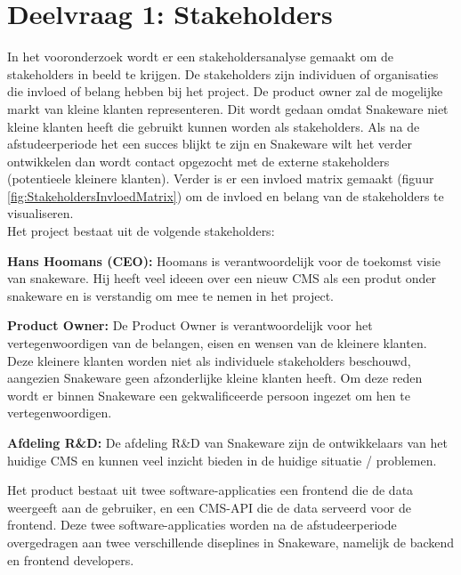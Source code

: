\section{Deelvraag 1: Stakeholders}
In het vooronderzoek wordt er een stakeholdersanalyse gemaakt om de stakeholders in beeld te krijgen.
De stakeholders zijn individuen of organisaties die invloed of belang hebben bij het project.
De product owner zal de mogelijke markt van kleine klanten representeren.
Dit wordt gedaan omdat Snakeware niet kleine klanten heeft die gebruikt kunnen worden als stakeholders.
Als na de afstudeerperiode het een succes blijkt te zijn en Snakeware wilt het verder ontwikkelen dan wordt contact opgezocht met de externe stakeholders (potentieele kleinere klanten). 
Verder is er een invloed matrix gemaakt (figuur \ref{fig:StakeholdersInvloedMatrix}) om de invloed en belang van de stakeholders te visualiseren. \\
Het project bestaat uit de volgende stakeholders:

\whitespace
\textbf{Hans Hoomans (CEO):}
Hoomans is verantwoordelijk voor de toekomst visie van snakeware.
Hij heeft veel ideeen over een nieuw \gls{CMS} als een produt onder snakeware en is verstandig om mee te nemen in het project.

\whitespace
\textbf{Product Owner:}
De Product Owner is verantwoordelijk voor het vertegenwoordigen van de belangen, eisen en wensen van de kleinere klanten.
Deze kleinere klanten worden niet als individuele stakeholders beschouwd, aangezien Snakeware geen afzonderlijke kleine klanten heeft.
Om deze reden wordt er binnen Snakeware een gekwalificeerde persoon ingezet om hen te vertegenwoordigen.

\whitespace
\textbf{Afdeling R\&D:} De afdeling R\&D van Snakeware zijn de ontwikkelaars van het huidige \gls{CMS} en kunnen veel inzicht bieden in de huidige situatie / problemen.

\whitespace
Het product bestaat uit twee software-applicaties een frontend die de data weergeeft aan de gebruiker, en een \gls{CMS}-API die de data serveerd voor de frontend.
Deze twee software-applicaties worden na de afstudeerperiode overgedragen aan twee verschillende diseplines in Snakeware, namelijk de backend en frontend developers.

